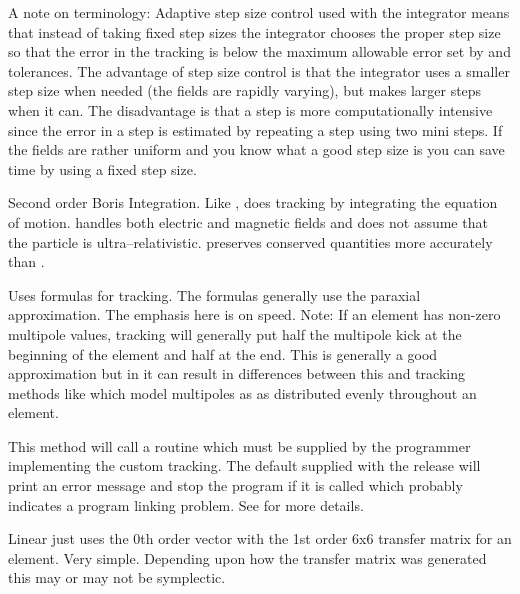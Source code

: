 A note on terminology: Adaptive step size control used with the
 integrator means that instead of taking fixed step
sizes the integrator chooses the proper step size so that the error in
the tracking is below the maximum allowable error set by 
and  tolerances. The advantage of step size control is
that the integrator uses a smaller step size when needed (the fields
are rapidly varying), but makes larger steps when it can. The
disadvantage is that a step is more computationally intensive since
the error in a step is estimated by repeating a step using two mini
steps. If the fields are rather uniform and you know what a good step
size is you can save time by using a fixed step size.

\begin{description}

\item[\vn{Boris}]
Second order Boris Integration\cite{b:boris}. Like ,
 does tracking by integrating the equation of
motion.  handles both electric and magnetic fields and does
not assume that the particle is ultra--relativistic.  preserves
conserved quantities more accurately than .

\item[\vn{Bmad_Standard}]
Uses formulas for tracking. The formulas generally use the paraxial
approximation.  The emphasis here is on speed. Note: If an element has
non-zero multipole values,  tracking will generally
put half the multipole kick at the beginning of the element and half
at the end. This is generally a good approximation but in it can
result in differences between this and tracking methods like
 which model multipoles as as distributed evenly
throughout an element.

\item[\vn{Custom}]
This method will call a routine  which must be
supplied by the programmer implementing the custom tracking. The
default  supplied with the \bmad release will print
an error message and stop the program if it is called which probably
indicates a program linking problem. See  for more details.

\item[\vn{Linear}]
Linear just uses the 0th order vector with the 1st order 6x6 transfer
matrix for an element. Very simple.  Depending upon how the transfer
matrix was generated this may or may not be symplectic.


\end{description}
